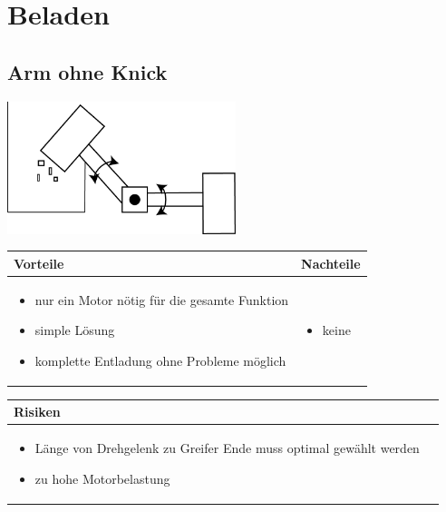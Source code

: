 
\section{Beladen}


\subsection{Arm ohne Knick}

\includegraphics[width=0.5\textwidth]{fig/Beladen_1.png}

\begin{table}[h]
\begin{tabular}{p{} | p{}}


 \textbf{Vorteile} & \textbf{Nachteile} \\ \hline
	 
\begin{itemize}
\item nur ein Motor nötig für die gesamte Funktion
\item simple Lösung
\item komplette Entladung ohne Probleme möglich
\end{itemize}

 
 &
 
\begin{itemize}
\item keine
\end{itemize}

\end{tabular}
\end{table}

\begin{table}[h]
\begin{tabular}{p{}p{}}


 \textbf{Risiken} & \\ \hline
	 
\begin{itemize}
\item Länge von Drehgelenk zu Greifer Ende muss optimal gewählt werden
\item zu hohe Motorbelastung
\end{itemize}
 
\end{tabular}
\end{table}

